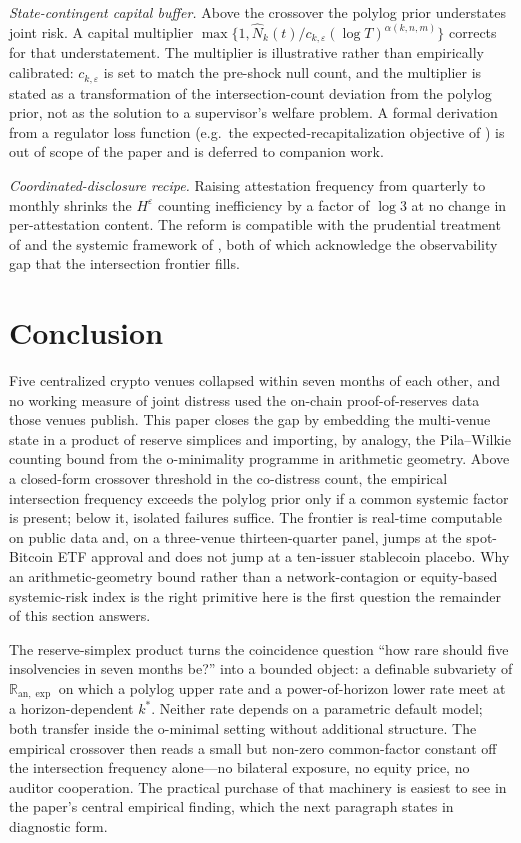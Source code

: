 \documentclass[12pt]{article}
\theoremstyle{sampledef}
\theoremstyle{sampleplain}
\theoremstyle{sampleremark}
\newcommand{\R}{\mathbb{R}}
\newcommand{\1}{\mathbf{1}}
\begin{document}
\emph{State-contingent capital buffer.} Above the crossover the
polylog prior understates joint risk. A capital multiplier
$\max\{1, \hat N_k(t) / c_{k,\varepsilon}(\log T)^{\alpha(k,n,m)}\}$
corrects for that understatement. The multiplier is illustrative
rather than empirically calibrated: $c_{k,\varepsilon}$ is set to
match the pre-shock null count, and the multiplier is stated as a
transformation of the intersection-count deviation from the polylog
prior, not as the solution to a supervisor's welfare problem. A
formal derivation from a regulator loss function (e.g.\ the
expected-recapitalization objective of
\citealp{AcharyaEtAl2017SES}) is out of scope of the paper and is
deferred to companion work.

\emph{Coordinated-disclosure recipe.} Raising attestation
frequency from quarterly to monthly shrinks the $H^\varepsilon$
counting inefficiency by a factor of $\log 3$ at no change in
per-attestation content. The reform is compatible with the
prudential treatment of \citet{BCBS2021Crypto} and the systemic
framework of \citet{FSB2023Crypto}, both of which acknowledge the
observability gap that the intersection frontier fills.

\section{Conclusion}\label{sec:conclusion}

Five centralized crypto venues collapsed within seven months of each
other, and no working measure of joint distress used the on-chain
proof-of-reserves data those venues publish. This paper closes the gap
by embedding the multi-venue state in a product of reserve simplices
and importing, by analogy, the Pila--Wilkie counting bound from the
o-minimality programme in arithmetic geometry. Above a closed-form
crossover threshold in the co-distress count, the empirical
intersection frequency exceeds the polylog prior only if a common
systemic factor is present; below it, isolated failures suffice. The
frontier is real-time computable on public data and, on a three-venue
thirteen-quarter panel, jumps at the spot-Bitcoin ETF approval and
does not jump at a ten-issuer stablecoin placebo. Why an
arithmetic-geometry bound rather than a network-contagion or
equity-based systemic-risk index is the right primitive here is the
first question the remainder of this section answers.

The reserve-simplex product turns the coincidence question ``how rare
should five insolvencies in seven months be?'' into a bounded object:
a definable subvariety of $\R_{\mathrm{an},\exp}$ on which a polylog
upper rate and a power-of-horizon lower rate meet at a
horizon-dependent $k^\ast$. Neither rate depends on a parametric
default model; both transfer inside the o-minimal setting without
additional structure. The empirical crossover then reads a small but
non-zero common-factor constant off the intersection frequency
alone---no bilateral exposure, no equity price, no auditor
cooperation. The practical purchase of that machinery is easiest to
see in the paper's central empirical finding, which the next
paragraph states in diagnostic form.
\end{document}
